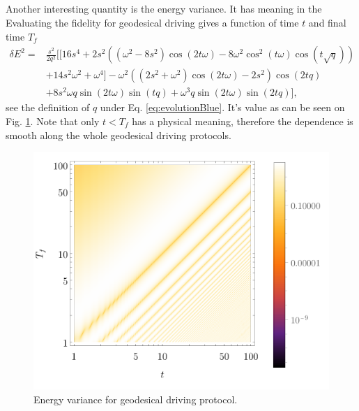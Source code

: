 \subsection{}
Another interesting quantity is the energy variance. It has meaning in the 
Evaluating the fidelity for geodesical driving gives a function of time $t$ and final time $T_f$
\begin{equation}
    \begin{split}        
        \delta E^2 =& \frac{s^2}{2 q^2}\Bigg[\Big[16 s^4+2 s^2 \left(\left(\omega ^2-8 s^2\right) \cos (2 t \omega )-8 \omega ^2 \cos ^2(t \omega ) \cos \left(t \sqrt{q}\right)\right)\\
        &+14 s^2 \omega ^2+\omega ^4\Big] -\omega ^2 \left(\left(2 s^2+\omega ^2\right) \cos (2 t \omega )-2 s^2\right) \cos \left(2 t q\right)\\
        & +8 s^2 \omega  q \sin (2 t \omega ) \sin \left(t q\right) + \omega ^3 q \sin (2 t \omega ) \sin \left(2 t q\right) \Bigg],
\end{split}
\end{equation}
see the definition of $q$ under Eq. \ref{eq:evolutionBlue}. It's value as can be seen on Fig. \ref{fig:densVar}. Note that only $t<T_f$ has a physical meaning, therefore the dependence is smooth along the whole geodesical driving protocols.

\begin{figure}[H]
    \centering
    \includegraphics[scale=1.2]{../img/densVar.pdf}
    \caption{Energy variance for geodesical driving protocol.}
    \label{fig:densVar}
\end{figure}

